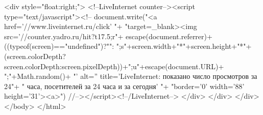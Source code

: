 		<div style="float:right;">
			<!--LiveInternet counter--><script type="text/javascript"><!--
			document.write("<a href='//www.liveinternet.ru/click' "+
			"target=_blank><img src='//counter.yadro.ru/hit?t17.5;r"+
			escape(document.referrer)+((typeof(screen)=="undefined")?"":
			";s"+screen.width+"*"+screen.height+"*"+(screen.colorDepth?
			screen.colorDepth:screen.pixelDepth))+";u"+escape(document.URL)+
			";"+Math.random()+
			"' alt='' title='LiveInternet: показано число просмотров за 24"+
			" часа, посетителей за 24 часа и за сегодня' "+
			"border='0' width='88' height='31'><\/a>")
			//--></script><!--/LiveInternet-->
		</div>
	</div>
</div>
</body>
</html>
